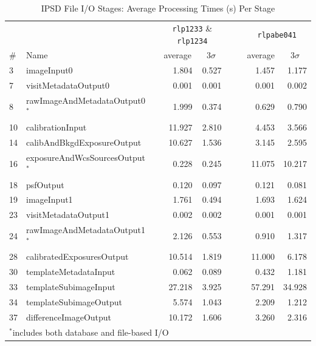 \begin{table}[htbp]
\begin{center}
\caption{IPSD File I/O Stages: Average Processing Times (s) Per Stage
\label{tbl:fiostagetimes}}
\small
\vspace{\baselineskip}
\begin{tabular}{llcrrc|crr}
\hline\hline
   &      && \multicolumn{2}{c}{{\tt rlp1233} \& {\tt rlp1234}} 
         &&& \multicolumn{2}{c}{{\tt rlpabe041}} \\
\# & Name && \multicolumn{1}{c}{average}&\multicolumn{1}{c}{$3\sigma$} 
         &&& \multicolumn{1}{c}{average}&\multicolumn{1}{c}{$3\sigma$} \\ 
\hline
 3 &                   imageInput0 &&  1.804 &  0.527 &&&  1.457 &  1.177 \\
 7 &          visitMetadataOutput0 &&  0.001 &  0.001 &&&  0.001 &  0.002 \\
 8 & rawImageAndMetadataOutput0$^*$&&  1.999 &  0.374 &&&  0.629 &  0.790 \\
10 &              calibrationInput && 11.927 &  2.810 &&&  4.453 &  3.566 \\
14 &    calibAndBkgdExposureOutput && 10.627 &  1.536 &&&  3.145 &  2.595 \\
16 &exposureAndWcsSourcesOutput$^*$&&  0.228 &  0.245 &&& 11.075 & 10.217 \\
18 &                     psfOutput &&  0.120 &  0.097 &&&  0.121 &  0.081 \\
19 &                   imageInput1 &&  1.761 &  0.494 &&&  1.693 &  1.624 \\
23 &          visitMetadataOutput1 &&  0.002 &  0.002 &&&  0.001 &  0.001 \\
24 & rawImageAndMetadataOutput1$^*$&&  2.126 &  0.553 &&&  0.910 &  1.317 \\
28 &     calibratedExposuresOutput && 10.514 &  1.819 &&& 11.000 &  6.178 \\
30 &         templateMetadataInput &&  0.062 &  0.089 &&&  0.432 &  1.181 \\
33 &         templateSubimageInput && 27.218 &  3.925 &&& 57.291 & 34.928 \\
34 &        templateSubimageOutput &&  5.574 &  1.043 &&&  2.209 &  1.212 \\
37 &         differenceImageOutput && 10.172 &  1.606 &&&  3.260 &  2.316 \\
\hline
\multicolumn{9}{l}{$^*$includes both database and file-based I/O}
\end{tabular}
\end{center}
\end{table}

